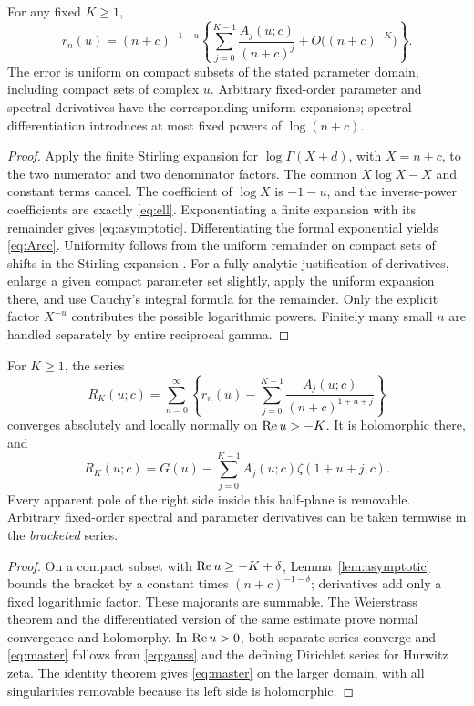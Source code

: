 \begin{lemma}\label{lem:asymptotic}
For any fixed $K\ge1$,
\begin{equation}\label{eq:asymptotic}
 r_n(u)=(n+c)^{-1-u}
 \left\{\sum_{j=0}^{K-1}\frac{A_j(u;c)}{(n+c)^j}
 +O\bigl((n+c)^{-K}\bigr)\right\}.
\end{equation}
The error is uniform on compact subsets of the stated parameter domain,
including compact sets of complex $u$.  Arbitrary fixed-order parameter
and spectral derivatives have the corresponding uniform expansions;
spectral differentiation introduces at most fixed powers of $\log(n+c)$.
\end{lemma}
\begin{proof}
Apply the finite Stirling expansion for $\log\Gamma(X+d)$, with
$X=n+c$, to the two numerator and two denominator factors.  The common
$X\log X-X$ and constant terms cancel.  The coefficient of $\log X$ is
$-1-u$, and the inverse-power coefficients are exactly \eqref{eq:ell}.
Exponentiating a finite expansion with its remainder gives
\eqref{eq:asymptotic}.  Differentiating the formal exponential yields
\eqref{eq:Arec}.  Uniformity follows from the uniform remainder on compact
sets of shifts in the Stirling expansion \cite[\S5.11]{dlmf-gamma}.
For a fully analytic justification of derivatives, enlarge a given compact
parameter set slightly, apply the uniform expansion there, and use Cauchy's
integral formula for the remainder.  Only the explicit factor
$X^{-u}$ contributes the possible logarithmic powers.  Finitely many small
$n$ are handled separately by entire reciprocal gamma.
\end{proof}

\begin{theorem}\label{thm:subtraction}
For $K\ge1$, the series
\begin{equation}\label{eq:RK}
 R_K(u;c)=\sum_{n=0}^\infty
 \left\{r_n(u)-\sum_{j=0}^{K-1}
       \frac{A_j(u;c)}{(n+c)^{1+u+j}}\right\}
\end{equation}
converges absolutely and locally normally on $\operatorname{Re} u>-K$.
It is holomorphic there, and
\begin{equation}\label{eq:master}
 \boxed{R_K(u;c)=G(u)-\sum_{j=0}^{K-1}
 A_j(u;c)\zeta(1+u+j,c).}
\end{equation}
Every apparent pole of the right side inside this half-plane is removable.
Arbitrary fixed-order spectral and parameter derivatives can be taken
termwise in the \emph{bracketed} series.
\end{theorem}
\begin{proof}
On a compact subset with $\operatorname{Re} u\ge-K+\delta$, Lemma~\ref{lem:asymptotic}
bounds the bracket by a constant times $(n+c)^{-1-\delta}$; derivatives
add only a fixed logarithmic factor.  These majorants are summable.
The Weierstrass theorem and the differentiated version of the same estimate
prove normal convergence and holomorphy.  In $\operatorname{Re} u>0$, both separate
series converge and \eqref{eq:master} follows from \eqref{eq:gauss} and
the defining Dirichlet series for Hurwitz zeta.  The identity theorem gives
\eqref{eq:master} on the larger domain, with all singularities removable
because its left side is holomorphic.
\end{proof}

